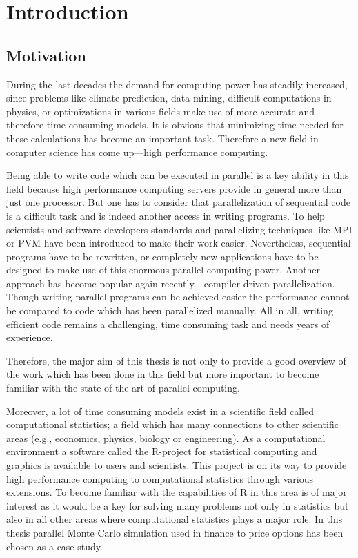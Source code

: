 \chapter{Introduction}
\section{Motivation}
During the last decades the demand for computing power has steadily
increased, since problems like climate prediction, data mining, difficult
computations in physics, or optimizations in various fields
make use of more accurate and therefore time consuming models. It is
obvious that minimizing time needed for these calculations has become
an important task. Therefore a new field in computer science has come
up---high performance computing.

Being able to write code which can be executed in parallel is a key
ability in this field because high performance computing servers
provide in general more than just one processor. But one has to
consider that
parallelization of sequential code is a difficult task and is indeed
another access in writing programs. To help scientists and software
developers standards and parallelizing techniques like MPI or PVM have
been introduced 
to make their work easier. Nevertheless, sequential programs have to
be rewritten, or completely new applications have to be designed to
make use of this enormous parallel computing power. Another approach
has become popular again recently---compiler driven
parallelization. Though writing parallel programs can be achieved
easier the performance cannot be compared to code which has been
parallelized manually. All in all,
writing efficient code remains a challenging, time consuming task and
needs years of experience. 

Therefore, the major aim of this thesis is not only to 
provide a good overview of the work which has been done in this field
but more important to become familiar with the state of the art of
parallel computing.

Moreover, a lot of  time consuming models exist in a scientific field
called computational statistics; a field which has many connections to other
scientific areas (e.g., economics, physics, biology or
engineering). As a computational environment a software called the
R-project for statistical computing and graphics is available to
users and scientists. This project is on its way to provide 
high performance computing to computational statistics through various
extensions. To become familiar with the capabilities of R in
this area is of major interest as it would be a key for solving many
problems not only in statistics but also in all other areas where
computational statistics plays a major role. In this thesis parallel
Monte Carlo simulation used in finance to price options has been
chosen as a case study.

